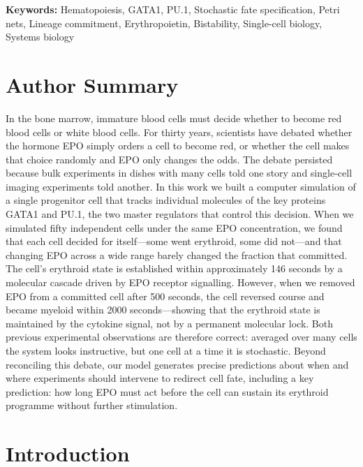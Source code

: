 \documentclass[10pt,letterpaper]{article}
\begin{document}
\vspace{6pt}
\noindent\textbf{Keywords:} Hematopoiesis, GATA1, PU.1, Stochastic fate specification, Petri nets, Lineage commitment, Erythropoietin, Bistability, Single-cell biology, Systems biology

\section*{Author Summary}

In the bone marrow, immature blood cells must decide whether to become red blood cells or white blood cells. For thirty years, scientists have debated whether the hormone EPO simply orders a cell to become red, or whether the cell makes that choice randomly and EPO only changes the odds. The debate persisted because bulk experiments in dishes with many cells told one story and single-cell imaging experiments told another. In this work we built a computer simulation of a single progenitor cell that tracks individual molecules of the key proteins GATA1 and PU.1, the two master regulators that control this decision. When we simulated fifty independent cells under the same EPO concentration, we found that each cell decided for itself---some went erythroid, some did not---and that changing EPO across a wide range barely changed the fraction that committed. The cell's erythroid state is established within approximately 146 seconds by a molecular cascade driven by EPO receptor signalling. However, when we removed EPO from a committed cell after 500 seconds, the cell reversed course and became myeloid within 2000 seconds---showing that the erythroid state is maintained by the cytokine signal, not by a permanent molecular lock. Both previous experimental observations are therefore correct: averaged over many cells the system looks instructive, but one cell at a time it is stochastic. Beyond reconciling this debate, our model generates precise predictions about when and where experiments should intervene to redirect cell fate, including a key prediction: how long EPO must act before the cell can sustain its erythroid programme without further stimulation.

\section{Introduction}

\end{document}
